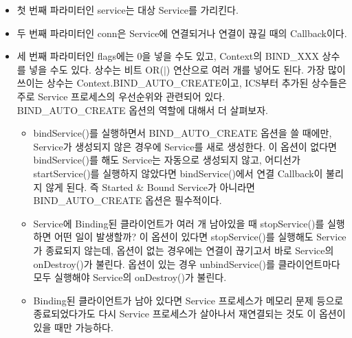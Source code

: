 \begin{itemize}
\item 첫 번째 파라미터인 service는 대상 Service를 가리킨다.
\item 두 번째 파라미터인 conn은 Service에 연결되거나 연결이 끊길 때의 Callback이다.
\item 세 번째 파라미터인 flags에는 0을 넣을 수도 있고, Context의 BIND\_XXX 상수를 넣을 수도 있다. 상수는 비트 OR($|$) 연산으로 여러 개를 넣어도 된다. 가장 많이 쓰이는 상수는 Context.BIND\_AUTO\_CRE\-ATE이고, ICS부터 추가된 상수들은 주로 Service 프로세스의 우선순위와 관련되어 있다.\\ 

BIND\_AUTO\_CREATE 옵션의 역할에 대해서 더 살펴보자.
\begin{itemize}
\item bindService()를 실행하면서 BIND\_AUTO\_CREATE 옵션을 쓸 때에만, Service가 생성되지 않은 경우에 Service를 새로 생성한다. 이 옵션이 없다면 bindService()를 해도 Service는 자동으로 생성되지 않고, 어디선가 startService()를 실행하지 않았다면 bindService()에서 연결 Callback이 불리지 않게 된다.
즉 Started \& Bound Service가 아니라면 BIND\_AUTO\_CREATE 옵션은 필수적이다. 
\item Service에 Binding된 클라이언트가 여러 개 남아있을 때 stopService()를 실행하면 어떤 일이 발생할까? 이 옵션이 있다면 stopService()를 실행해도 Service가 종료되지 않는데, 옵션이 없는 경우에는 연결이 끊기고서 바로 Service의 onDestroy()가 불린다.
옵션이 있는 경우 unbindService()를 클라이언트마다 모두 실행해야 Service의 onDestroy()가 불린다.
\item Binding된 클라이언트가 남아 있다면 Service 프로세스가 메모리 문제 등으로 종료되었다가도 다시 Service 프로세스가 살아나서 재연결되는 것도 이 옵션이 있을 때만 가능하다. 
\end{itemize}

\end{itemize}

